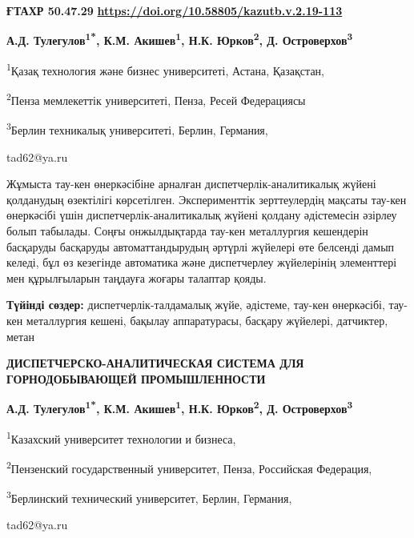 \clearpage
{\bfseries ҒТАХР 50.47.29}\hfill
\hfill {\bfseries \href{https://doi.org/10.58805/kazutb.v.2.19-113}{https://doi.org/10.58805/kazutb.v.2.19-113}}


\begin{center}
{\bfseries А.Д. Тулегулов\textsuperscript{1*}, К.М.
Акишев\textsuperscript{1}, Н.К. Юрков\textsuperscript{2}, Д.
Островерхов\textsuperscript{3}}

\textsuperscript{1}Қазақ технология және бизнес университеті, Астана,
Қазақстан,

\textsuperscript{2}Пенза мемлекеттік университеті, Пенза, Ресей
Федерациясы

\textsuperscript{3}Берлин техникалық университеті, Берлин, Германия,

tad62@ya.ru
\end{center}

\hspace{1.5em} Жұмыста тау-кен өнеркәсібіне арналған диспетчерлік-аналитикалық жүйені
қолданудың өзектілігі көрсетілген. Эксперименттік зерттеулердің мақсаты
тау-кен өнеркәсібі үшін диспетчерлік-аналитикалық жүйені қолдану
әдістемесін әзірлеу болып табылады. Соңғы онжылдықтарда тау-кен
металлургия кешендерін басқаруды басқаруды автоматтандырудың әртүрлі
жүйелері өте белсенді дамып келеді, бұл өз кезегінде автоматика және
диспетчерлеу жүйелерінің элементтері мен құрылғыларын таңдауға жоғары
талаптар қояды.

\hspace{1.5em} {\bfseries Түйінді сөздер:} диспетчерлік-талдамалық жүйе, әдістеме, тау-кен
өнеркәсібі, тау-кен металлургия кешені, бақылау аппаратурасы, басқару
жүйелері, датчиктер, метан

\begin{center}
{\large\bfseries ДИСПЕТЧЕРСКО-АНАЛИТИЧЕСКАЯ СИСТЕМА ДЛЯ ГОРНОДОБЫВАЮЩЕЙ ПРОМЫШЛЕННОСТИ}

\vspace{1em}

{\bfseries А.Д. Тулегулов\textsuperscript{1*}, К.М.
Акишев\textsuperscript{1}, Н.К. Юрков\textsuperscript{2}, Д.
Островерхов\textsuperscript{3}}

\textsuperscript{1}Казахский университет технологии и бизнеса,

\textsuperscript{2}Пензенский государственный университет, Пенза,
Российская Федерация,

\textsuperscript{3}Берлинский технический университет, Берлин, Германия,

tad62@ya.ru
\end{center}

